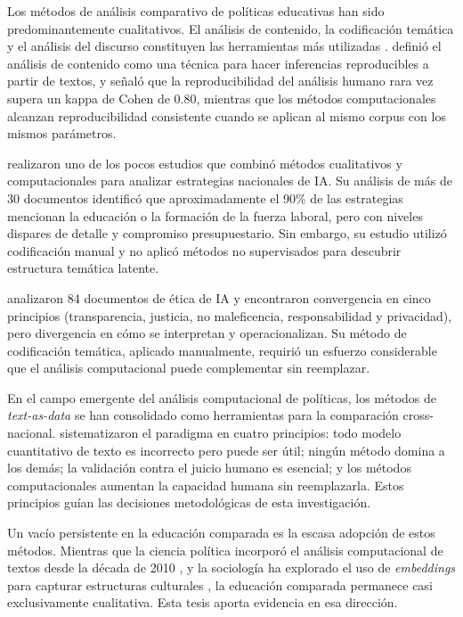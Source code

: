 Los métodos de análisis comparativo de políticas educativas han sido predominantemente cualitativos. El análisis de contenido, la codificación temática y el análisis del discurso constituyen las herramientas más utilizadas \citep{bray2014comparative}. \citet{krippendorff2018content} definió el análisis de contenido como una técnica para hacer inferencias reproducibles a partir de textos, y señaló que la reproducibilidad del análisis humano rara vez supera un kappa de Cohen de 0.80, mientras que los métodos computacionales alcanzan reproducibilidad consistente cuando se aplican al mismo corpus con los mismos parámetros.

\citet{fatima2020aipolicy} realizaron uno de los pocos estudios que combinó métodos cualitativos y computacionales para analizar estrategias nacionales de IA. Su análisis de más de 30 documentos identificó que aproximadamente el 90\% de las estrategias mencionan la educación o la formación de la fuerza laboral, pero con niveles dispares de detalle y compromiso presupuestario. Sin embargo, su estudio utilizó codificación manual y no aplicó métodos no supervisados para descubrir estructura temática latente.

\citet{jobin2019landscape} analizaron 84 documentos de ética de IA y encontraron convergencia en cinco principios (transparencia, justicia, no maleficencia, responsabilidad y privacidad), pero divergencia en cómo se interpretan y operacionalizan. Su método de codificación temática, aplicado manualmente, requirió un esfuerzo considerable que el análisis computacional puede complementar sin reemplazar.

En el campo emergente del análisis computacional de políticas, los métodos de \textit{text-as-data} se han consolidado como herramientas para la comparación cross-nacional. \citet{grimmer2022text} sistematizaron el paradigma en cuatro principios: todo modelo cuantitativo de texto es incorrecto pero puede ser útil; ningún método domina a los demás; la validación contra el juicio humano es esencial; y los métodos computacionales aumentan la capacidad humana sin reemplazarla. Estos principios guían las decisiones metodológicas de esta investigación.

Un vacío persistente en la educación comparada es la escasa adopción de estos métodos. Mientras que la ciencia política incorporó el análisis computacional de textos desde la década de 2010 \citep{grimmer2013text}, y la sociología ha explorado el uso de \textit{embeddings} para capturar estructuras culturales \citep{kozlowski2019geometry}, la educación comparada permanece casi exclusivamente cualitativa. Esta tesis aporta evidencia en esa dirección.

